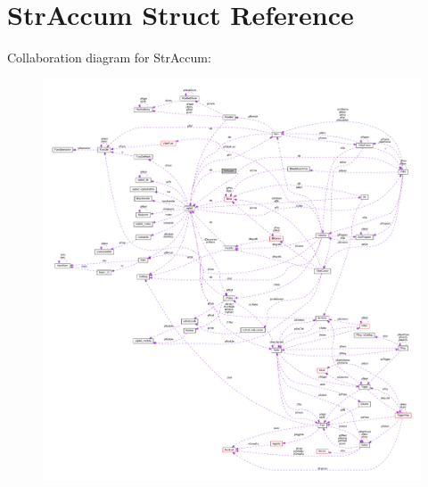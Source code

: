 \hypertarget{struct_str_accum}{\section{Str\-Accum Struct Reference}
\label{struct_str_accum}
}


Collaboration diagram for Str\-Accum\-:\nopagebreak
\begin{figure}[H]
\begin{center}
\leavevmode
\includegraphics[width=350pt]{struct_str_accum__coll__graph}
\end{center}
\end{figure}
